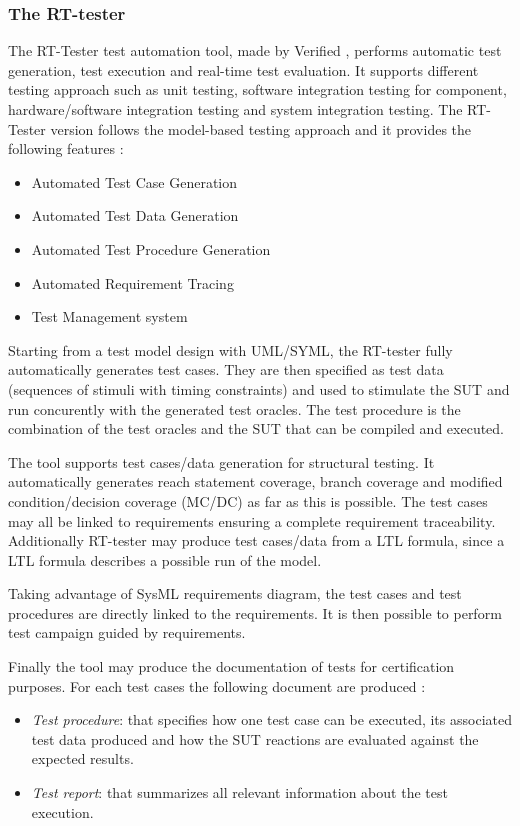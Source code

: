 \documentclass{template/openetcs_report}
\begin{document}
\subsubsection{The RT-tester} 

The RT-Tester test automation tool, made by Verified
\cite{verified_website}, performs automatic test generation, test
execution and real-time test evaluation.  It supports different
testing approach such as unit testing, software integration testing
for component, hardware/software integration testing and system
integration testing.  The RT-Tester version  follows the
model-based testing approach \cite{Peleska2011} and
it provides the following features :
\begin{itemize}
\item Automated Test Case Generation 
\item Automated Test Data Generation 
\item Automated Test Procedure Generation 
\item Automated Requirement Tracing 
\item Test Management system 
\end{itemize}
Starting from a test model design with UML/SYML, the RT-tester fully
automatically generates test cases. They are then specified as test
data (sequences of stimuli with timing constraints) and used to
stimulate the SUT and run concurently with the generated test
oracles. The test procedure is the combination of the test oracles and
the SUT that can be compiled and executed.

The tool supports test cases/data generation for structural
testing. It automatically generates  reach statement coverage, branch coverage and
modified condition/decision coverage (MC/DC) as far as this is possible.
The test cases may all be linked to requirements ensuring a complete
requirement traceability. 
Additionally RT-tester may produce test cases/data from a LTL
formula, since a LTL formula describes a possible run of the model.

Taking advantage of SysML requirements diagram, the test cases and
test procedures are directly linked to the requirements. It is then
possible to perform test campaign guided by requirements.

Finally the tool may produce the documentation of tests for
certification purposes. For each test cases the following document are
produced :
\begin{itemize}
\item {\em Test procedure}: that specifies  how one test case can be
  executed, its associated test data produced and how the SUT
  reactions are evaluated against the expected results.
\item {\em Test report}: that summarizes all relevant information
  about the test execution.
\end{itemize}
\end{document}
